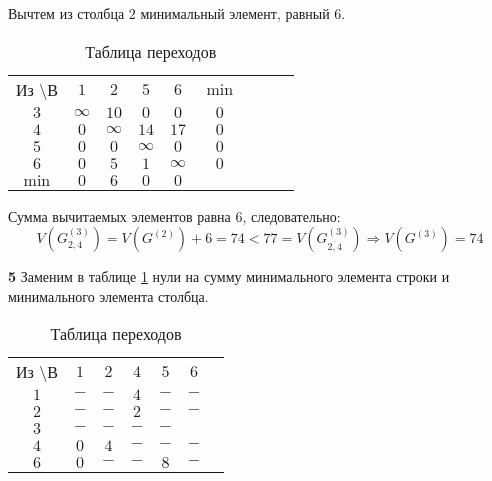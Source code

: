 Вычтем из столбца $2$ минимальный элемент, равный $6$.

\begin{table}[H]
\begin{center}
	\def\tabcolsep{15pt}
	\caption{Таблица переходов}
	\label{tab:24}
	\begin{tabular}{|c||c|c|c|c|c|c|c|c|}
		\hline
		Из \textbackslash В & $1$ & $2$ & $5$ & $6$ & $\min$ \\
		\hhline{|=#=|=|=|=|=|=|}
		\hline
		$3$ & $\infty$ & $10$ & $0$ & $0$ & $0$  \\ 
		\hline
		$4$ & $0$ & $\infty$ & $14$ & $17$ & $0$  \\
		\hline
		$5$ & $0$ & $0$ & $\infty$ & $0$ & $0$  \\
		\hline
		$6$ & $0$ & $5$ & $1$ & $\infty$ & $0$  \\ 
		\hhline{|=#=|=|=|=|=|=|}
		$\min$ & $0$ & $6$ & $0$ & $0$ & \\
		\hline 
	\end{tabular}
\end{center}
\end{table}

Сумма вычитаемых элементов равна $6$, следовательно:
\begin{equation*}
V(G_{2,4}^{(3)}) = V(G^{(2)}) + 6 = 74 < 77 = V(G_{\overline{2,4}}^{(3)}) \Rightarrow V(G^{(3)}) = 74
\end{equation*}

\textbf{5} Заменим в таблице \ref{tab:24} нули на сумму минимального элемента строки и минимального элемента столбца.

\begin{table}[H]
\begin{center}
	\def\tabcolsep{15pt}
	\caption{Таблица переходов}
	\label{tab:25}
	\begin{tabular}{|c||c|c|c|c|c|c|}
		\hline
		Из \textbackslash В & $1$ & $2$ & $4$ & $5$ & $6$ \\
		\hhline{|=#=|=|=|=|=|}
		$1$ & $-$ & $-$ & $4$ & $-$ & $-$ \\
		\hline
		$2$ & $-$ & $-$ & $2$ & $-$ & $-$ \\
		\hline
		$3$ & $-$ & $-$ & $-$ & $-$ & \redbold{$12$} \\ 
		\hline
		$4$ & $0$ & $4$ & $-$ & $-$ & $-$ \\
		\hline
		$6$ & $0$ & $-$ & $-$ & $8$ & $-$ \\
		\hline
	\end{tabular}
\end{center}
\end{table}

